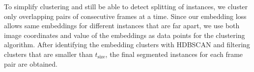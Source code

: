 \documentclass[runningheads,a4paper]{llncs}
\newcommand{\christian}[1]{\textcolor{blue}{[#1]}}
\newcommand{\thomas}[1]{\textcolor{purple}{[#1]}}
\begin{document}
To simplify clustering and still be able to detect splitting of instances, we cluster only overlapping pairs of consecutive frames at a time. %
Since our embedding loss allows same embeddings for different instances that are far apart, we use both image coordinates and value of the embeddings as data points for the clustering algorithm.
After identifying the embedding clusters with HDBSCAN and filtering clusters that are smaller than $t_{\text{size}}$, the final segmented instances for each frame pair are obtained.
\end{document}
